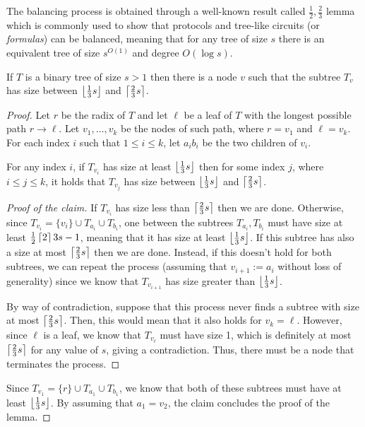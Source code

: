 The balancing process is obtained through a well-known result called $\frac{1}{2}, \frac{2}{3}$ lemma \cite{13_23_lemma} which is commonly used to show that protocols and tree-like circuits (or \textit{formulas}) can be balanced, meaning that for any tree of size $s$ there is an equivalent tree of size $s^{O(1)}$ and degree $O(\log s)$.

\newpage

\begin{lemma}
    \label{13_23_lewis}
 If $T$ is a binary tree of size $s > 1$ then there is a node $v$ such that the subtree $T_v$ has size between $\left \lfloor \frac{1}{3} s \right \rfloor$ and $\left \lceil \frac{2}{3} s \right \rceil$.
\end{lemma}

\begin{proof}
    Let $r$ be the radix of $T$ and let $\ell$ be a leaf of $T$ with the longest possible path $r \to \ell$. Let $v_1, \ldots, v_k$ be the nodes of such path, where $r = v_1$ and $\ell = v_k$. For each index $i$ such that $1 \leq i \leq k$, let $a_i b_i$ be the two children of $v_i$.

    \begin{claimlemma}
        For any index $i$, if $T_{v_i}$ has size at least $\left \lfloor \frac{1}{3} s \right \rfloor$ then for some index $j$, where $i \leq j \leq k$, it holds that $T_{v_j}$ has size between $\left \lfloor \frac{1}{3} s \right \rfloor$ and $\left \lceil \frac{2}{3} s \right \rceil$.
    \end{claimlemma}

    \begin{proof}[Proof of the claim]
        If $T_{v_i}$ has size less than $\left \lceil \frac{2}{3} s \right \rceil$ then we are done. Otherwise, since $T_{v_i} = \{v_i\} \cup T_{a_i} \cup T_{b_i}$, one between the subtrees $T_{a_i}, T_{b_i}$ must have size at least $\frac{1}{2} \left \lceil 2 \right \rceil{3} s - 1$, meaning that it has size at least $\left \lfloor \frac{1}{3} s \right \rfloor$. If this subtree has also a size at most $\left \lceil \frac{2}{3} s \right \rceil$ then we are done. Instead, if this doesn't hold for both subtrees, we can repeat the process (assuming that $v_{i+1} := a_i$ without loss of generality) since we know that $T_{v_{i+1}}$ has size greater than $\left \lfloor \frac{1}{3} s \right \rfloor$.

        By way of contradiction, suppose that this process never finds a subtree with size at most $\left \lceil \frac{2}{3} s \right \rceil$. Then, this would mean that it also holds for $v_k = \ell$. However, since $\ell$ is a leaf, we know that $T_{v_\ell}$ must have size 1, which is definitely at most $\left \lceil \frac{2}{3} s \right \rceil$ for any value of $s$, giving a contradiction. Thus, there must be a node that terminates the process.
    \end{proof}
        
    Since $T_{v_1} = \{r\} \cup T_{a_1} \cup T_{b_1}$, we know that both of these subtrees must have at least $\left \lfloor \frac{1}{3} s \right \rfloor$. By assuming that $a_1 = v_{2}$, the claim concludes the proof of the lemma.
\end{proof}

